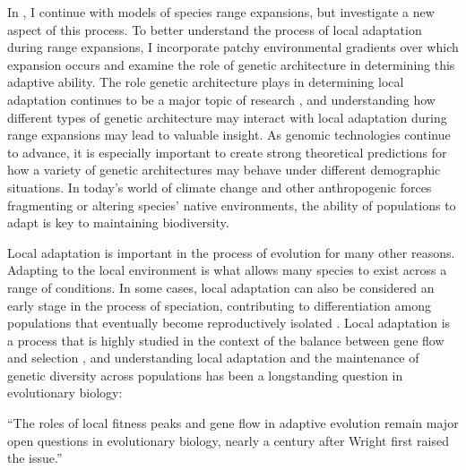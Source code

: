 In , I continue with models of species range expansions, but investigate a new aspect of this process. To better understand the process of local adaptation during range expansions, I incorporate patchy environmental gradients over which expansion occurs and examine the role of genetic architecture in determining this adaptive ability. The role genetic architecture plays in determining local adaptation continues to be a major topic of research \citep{Holt:2003, Yeaman:2015, Yeaman:2011, Carroll:2001, Holloway:1990, Peichel:2001, Bratteler:2006, Schiffers:2014}, and understanding how different types of genetic architecture may interact with local adaptation during range expansions may lead to valuable insight. As genomic technologies continue to advance, it is especially important to create strong theoretical predictions for how a variety of genetic architectures may behave under different demographic situations. In today's world of climate change and other anthropogenic forces fragmenting or altering species' native environments, the ability of populations to adapt is key to maintaining biodiversity.

Local adaptation is important in the process of evolution for many other reasons. Adapting to the local environment is what allows many species to exist across a range of conditions. In some cases, local adaptation can also be considered an early stage in the process of speciation, contributing to differentiation among populations that eventually become reproductively isolated \citep{Via:2012, Kirkpatrick:2006}. Local adaptation is a process that is highly studied in the context of the balance between gene flow and selection \citep{Kawecki:2004}, and understanding local adaptation and the maintenance of genetic diversity across populations has been a longstanding question in evolutionary biology:
\begin{quoteshrink}
  ``The roles of local fitness peaks and gene flow in adaptive evolution remain major open questions in evolutionary biology, nearly a century after Wright first raised the issue.''
  \hfill\citet{Barton:2016}
\end{quoteshrink}

